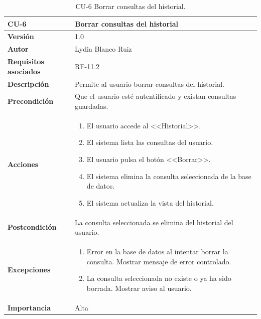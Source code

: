 \begin{table}[p]
	\centering
	\begin{tabularx}{\linewidth}{ p{} p{} }
		\toprule
		\textbf{CU-6}    & \textbf{Borrar consultas del historial}\\
		\toprule
		\textbf{Versión}              & 1.0    \\
		\textbf{Autor}                & Lydia Blanco Ruiz \\
		\textbf{Requisitos asociados} & RF-11.2 \\
		\textbf{Descripción}          & Permite al usuario borrar consultas del historial. \\
		\textbf{Precondición}         & Que el usuario esté autentificado y existan consultas guardadas. \\
		\textbf{Acciones}             &
		\begin{enumerate}
			\def\labelenumi{\arabic{enumi}.}
			\tightlist
			\item El usuario accede al <<Historial>>.
			\item El sistema lista las consultas del usuario.
			\item El usuario pulsa el botón <<Borrar>>.
			\item El sistema elimina la consulta seleccionada de la base de datos.
			\item El sistema actualiza la vista del historial.
		\end{enumerate}\\
		\textbf{Postcondición}        & La consulta seleccionada se elimina del historial del usuario. \\
		\textbf{Excepciones}          & 
		\begin{enumerate}
			\def\labelenumi{\arabic{enumi}.}
			\tightlist
			\item Error en la base de datos al intentar borrar la consulta. Mostrar mensaje de error controlado.
			\item La consulta seleccionada no existe o ya ha sido borrada. Mostrar aviso al usuario.
		\end{enumerate}\\
		\textbf{Importancia}          & Alta  \\
		\bottomrule
	\end{tabularx}
	\caption{CU-6 Borrar consultas del historial.}
\end{table}

